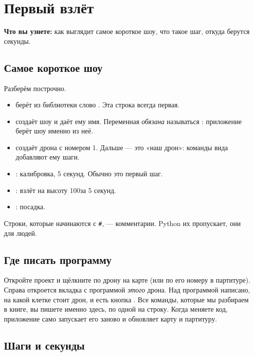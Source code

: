 \chapter{Первый взлёт}\label{ch:vzlet}

\textbf{Что вы узнете:} как выглядит самое короткое шоу, что такое шаг, откуда берутся секунды.

\section{Самое короткое шоу}


Разберём построчно.
\begin{itemize}
  \item {} берёт из библиотеки слово . Эта строка всегда первая.
  \item {} создаёт шоу и даёт ему имя. Переменная \emph{обязана} называться : приложение берёт шоу именно из неё.
  \item {} создаёт дрона с номером 1. Дальше  — это «наш дрон»: команды вида  добавляют ему шаги.
  \item {}: калибровка, 5 секунд. Обычно это первый шаг.
  \item {}: взлёт на высоту 100\cm за 5 секунд.
  \item {}: посадка.
\end{itemize}

Строки, которые начинаются с \texttt{\#}, — комментарии. Python их пропускает, они для людей.

\section{Где писать программу}

Откройте проект и щёлкните по дрону на карте (или по его номеру в партитуре). Справа откроется вкладка  с программой \emph{этого} дрона. Над программой написано, на какой клетке стоит дрон, и есть кнопка . Все команды, которые мы разбираем в книге, вы пишете именно здесь, по одной на строку. Когда меняете код, приложение само запускает его заново и обновляет карту и партитуру.

\section{Шаги и секунды}

